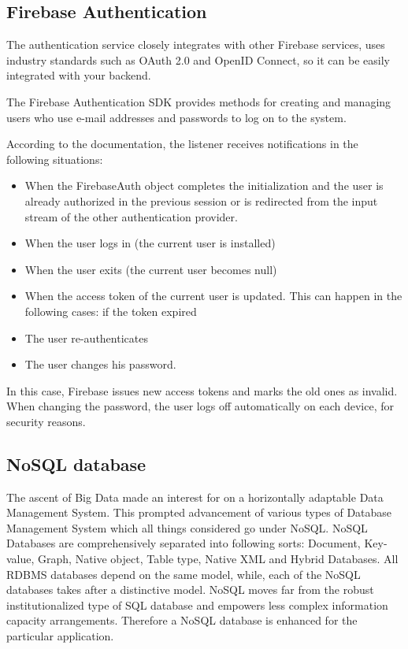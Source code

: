 \subsection{Firebase Authentication}
The authentication service closely integrates with other Firebase services, uses industry standards such as OAuth 2.0 and OpenID Connect, so it can be easily integrated with your backend.\par
The Firebase Authentication SDK provides methods for creating and managing users who use e-mail addresses and passwords to log on to the system.\par
According to the documentation, the listener receives notifications in the following situations:
\begin{itemize}
\item When the FirebaseAuth object completes the initialization and the user is already authorized in the previous session or is redirected from the input stream of the other authentication provider.
\item When the user logs in (the current user is installed)
\item When the user exits (the current user becomes null)
\item When the access token of the current user is updated. This can happen in the following cases:
if the token expired
\item The user re-authenticates
\item The user changes his password.
\end{itemize}
In this case, Firebase issues new access tokens and marks the old ones as invalid. When changing the password, the user logs off automatically on each device, for security reasons. \cite{Firebase}

\subsection{NoSQL database}
The ascent of Big Data made an interest for on a horizontally adaptable Data Management System. This prompted advancement of various types of Database Management System which all things considered go under NoSQL. NoSQL Databases are comprehensively separated into following sorts: Document, Key-value, Graph, Native object, Table type, Native XML and Hybrid Databases. All RDBMS databases depend on the same model, while, each of the NoSQL databases takes after a distinctive model. NoSQL moves far from the robust institutionalized type of SQL database and empowers less complex information capacity arrangements. Therefore a NoSQL database is enhanced for the particular application.\cite{noSql}

